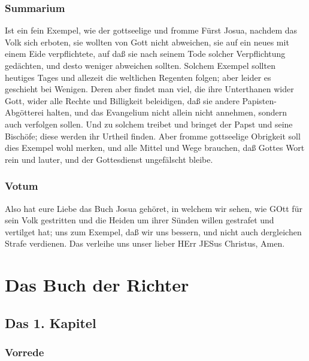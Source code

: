 \section{Summarium}

Ist ein fein Exempel, wie der gottseelige und fromme Fürst Josua, nachdem das Volk sich erboten, sie wollten von Gott nicht abweichen, sie auf ein neues mit einem Eide verpflichtete, auf daß sie nach seinem Tode solcher Verpflichtung gedächten, und desto weniger abweichen sollten. Solchem Exempel sollten heutiges Tages und allezeit die weltlichen Regenten folgen; aber leider es geschieht bei Wenigen. Deren aber findet man viel, die ihre Unterthanen wider Gott, wider alle Rechte und Billigkeit beleidigen, daß sie andere Papisten-Abgötterei halten, und das Evangelium nicht allein nicht annehmen, sondern auch verfolgen sollen. Und zu solchem treibet und bringet der Papst und seine Bischöfe; diese werden ihr Urtheil finden. Aber fromme gottseelige Obrigkeit soll dies Exempel wohl merken, und alle Mittel und Wege brauchen, daß Gottes Wort rein und lauter, und der Gottesdienst ungefälscht bleibe.

\section{Votum}

Also hat eure Liebe das Buch Josua gehöret, in welchem wir sehen, wie GOtt für sein Volk gestritten und die Heiden um ihrer Sünden willen gestrafet und vertilget hat; uns zum Exempel, daß wir uns bessern, und nicht auch dergleichen Strafe verdienen. Das verleihe uns unser lieber HErr JESus Christus, Amen.

\part{Das Buch der Richter}

\chapter{Das 1. Kapitel}

\section{Vorrede}


